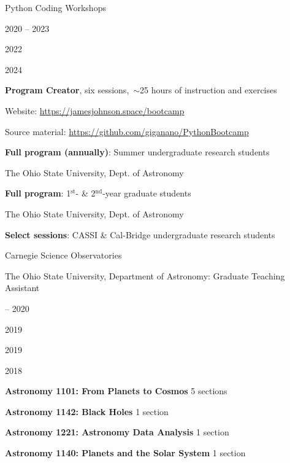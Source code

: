 \documentclass[cv.tex]{subfiles}
\begin{document}
{\color{themecolor} \large Python Coding Workshops}
\par\noindent
\parbox{0.18\textwidth}{%
	\vspace{2mm}
	\raggedleft
	\null \par
	\null \par
	\null \par
	2020 -- 2023 \par
	\null \par
	2022 \par
	\null \par
	2024 \par
	\null
}
\hspace{1mm}
\parbox{0.73\textwidth}{%
	\textbf{Program Creator}, six sessions,~$\sim$25 hours of instruction
	and exercises \par
	Website: {\small \url{https://jamesjohnson.space/bootcamp}} \par
	Source material:
	{\small \url{https://github.com/giganano/PythonBootcamp}} \par
	\textbf{Full program (annually)}: Summer undergraduate research students \par
	The Ohio State University, Dept. of Astronomy \par
	\textbf{Full program}: 1$^\text{st}$- \& 2$^\text{nd}$-year graduate
	students \par
	The Ohio State University, Dept. of Astronomy \par
	\textbf{Select sessions}: CASSI \& Cal-Bridge undergraduate research
	students \par
	Carnegie Science Observatories
}

\vspace{4mm}
\noindent
{\color{themecolor} \large The Ohio State University, Department of Astronomy:
Graduate Teaching Assistant}
\par\noindent
\parbox{0.18\textwidth}{%
	 -- 2020 \par
	2019 \par
	2019 \par
	2018
}
\hspace{1mm}
\parbox{0.8\textwidth}{%
	\vspace{1mm}
	\textbf{Astronomy 1101: From Planets to Cosmos} \hfill 5 sections \par
	\textbf{Astronomy 1142: Black Holes} \hfill 1 section \par
	\textbf{Astronomy 1221: Astronomy Data Analysis} \hfill 1 section \par
	\textbf{Astronomy 1140: Planets and the Solar System} \hfill 1 section \par
}
\end{document}
